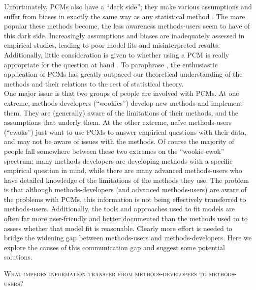 \documentclass[a4paper,12pt]{article}
\renewcommand{\section}[1]{
  \bigskip
  \begin{center}
  \begin{Large}
  \normalfont\scshape #1
  \medskip
  \end{Large}
  \end{center}
}
\begin{document}
Unfortunately, PCMs also have a ``dark side''; they make various assumptions and suffer from biases in exactly the same way as any statistical method \citep{freckleton2009seven,boettiger2012your}. 
The more popular these methods become, the less awareness methods-users seem to have of this dark side. Increasingly assumptions and biases are inadequately assessed in empirical studies, leading to poor model fits and misinterpreted results. 
Additionally, little consideration is given to whether using a PCM is really appropriate for the question at hand \citep{losos2011seeing}. 
To paraphrase \citet{blomberg2012independent}, the enthusiastic application of PCMs has greatly outpaced our theoretical understanding of the methods and their relations to the rest of statistical theory.\\


One major issue is that two groups of people are involved with PCMs. 
At one extreme, methods-developers (``wookies'') develop new methods and implement them. They are (generally) aware of the limitations of their methods, and the assumptions that underly them. 
At the other extreme, na\"{i}ve methods-users (``ewoks'') just want to use PCMs to answer empirical questions with their data, and may not be aware of issues with the methods. 
Of course the majority of people fall somewhere between these two extremes on the ``wookie-ewok'' spectrum; many methods-developers are developing methods with a specific empirical question in mind, while there are many advanced methods-users who have detailed knowledge of the limitations of the methods they use. 
The problem is that although methods-developers (and advanced methods-users) are aware of the problems with PCMs, this information is not being effectively transferred to methods-users. Additionally, the tools and approaches used to fit models are often far more user-friendly and better documented than the methods used to to assess whether that model fit is reasonable. 
Clearly more effort is needed to bridge the widening gap between methods-users and methods-developers. Here we explore the causes of this communication gap and suggest some potential solutions. %

\section{What impedes information transfer from methods-developers to methods-users?}
\end{document}
